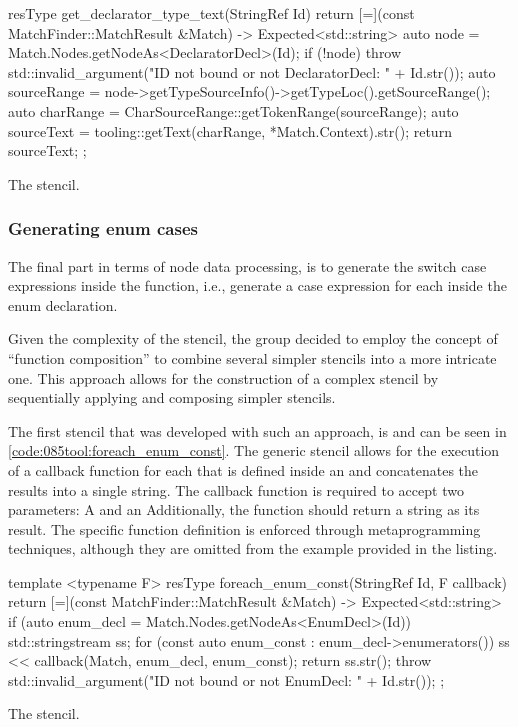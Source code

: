 \begin{listing}[H]
    \begin{cppcode}
resType get_declarator_type_text(StringRef Id) {
return [=](const MatchFinder::MatchResult &Match) -> Expected<std::string> {
    auto node = Match.Nodes.getNodeAs<DeclaratorDecl>(Id);
    if (!node) {
        throw std::invalid_argument("ID not bound or not DeclaratorDecl: " + Id.str());
    }
    auto sourceRange = node->getTypeSourceInfo()->getTypeLoc().getSourceRange();
    auto charRange = CharSourceRange::getTokenRange(sourceRange);
    auto sourceText = tooling::getText(charRange, *Match.Context).str();
    return sourceText;
};
}
    \end{cppcode}
    \caption{The  stencil.}
    \label{code:085tool:get_declarator_type_text}
\end{listing}

\subsubsection*{Generating enum cases}
The final part in terms of node data processing, is to generate the switch case expressions inside the  function, i.e., generate a case expression for each  inside the enum declaration.

Given the complexity of the stencil, the group decided to employ the concept of ``function composition'' to combine several simpler stencils into a more intricate one.
This approach allows for the construction of a complex stencil by sequentially applying and composing simpler stencils.

The first stencil that was developed with such an approach, is  and can be seen in \cref{code:085tool:foreach_enum_const}.
The generic stencil allows for the execution of a callback function for each  that is defined inside an  and concatenates the results into a single string.
The callback function is required to accept two parameters: A  and an Additionally, the function should return a string as its result.
The specific function definition is enforced through metaprogramming techniques, although they are omitted from the example provided in the listing.

\begin{listing}[H]
    \begin{cppcode}
template <typename F>
resType foreach_enum_const(StringRef Id, F callback) {
	return [=](const MatchFinder::MatchResult &Match) -> Expected<std::string> {
		if (auto enum_decl = Match.Nodes.getNodeAs<EnumDecl>(Id)) {
			std::stringstream ss;
			for (const auto enum_const : enum_decl->enumerators()) {
				ss << callback(Match, enum_decl, enum_const);
			}
			return ss.str();
		}
		throw std::invalid_argument("ID not bound or not EnumDecl: " + Id.str());
	};
}
    \end{cppcode}
    \caption{The  stencil.}
    \label{code:085tool:foreach_enum_const}
\end{listing}

